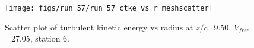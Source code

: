 \begin{figure}[H]
\centering
\texttt{[image: figs/run\_57/run\_57\_ctke\_vs\_r\_meshscatter]}
\caption{Scatter plot of turbulent kinetic energy vs radius at $z/c$=9.50, $V_{free}$=27.05, station 6.}
\end{figure}


